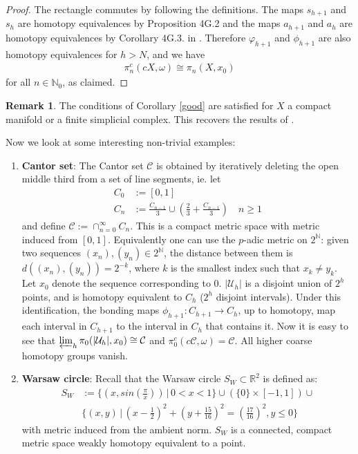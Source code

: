 \documentclass[a4paper,11pt]{article}
\theoremstyle{definition}
\newtheorem*{remark}{Remark}
\theoremstyle{plain}
\theoremstyle{remark}
\begin{document}
{\begin{proof}
The rectangle commutes by following the definitions. The maps $s_{h+1}$ and $s_{h}$ are homotopy equivalences by Proposition 4G.2 and the maps $a_{h+1}$ and $a_{h}$ are homotopy equivalences by Corollary 4G.3. in \cite{hatcher2002algebraic}. Therefore $\varphi_{h+1}$ and $\phi_{h+1}$ are also homotopy equivalences for $h>N$, and we have
\begin{align*}
\pi_{n}^{c}(cX,\omega)\cong \pi_{n}(X,x_0)
\end{align*}
for all $n\in \mathbb{N}_{0}$, as claimed. 
\end{proof}

\begin{remark} The conditions of Corollary \ref{good} are satisfied for $X$ a compact manifold or a finite simplicial complex. This recovers the results of \cite{mitchener2020coarse}. 
\end{remark}


Now we look at some interesting non-trivial examples:

\begin{enumerate}
\item \textbf{Cantor set}: The Cantor set $\mathcal{C}$ is obtained by iteratively deleting the open middle third from a set of line segments, ie. let
\begin{align*}
C_{0} &:= [0,1]\\
C_{n} &:= \frac{C_{n-1}}{3} \cup (\frac{2}{3} +\frac{C_{n-1}}{3}) \quad n\geq 1
\end{align*}
and define $\mathcal{C}:= \cap_{n=0}^{\infty} C_{n}$. This is a compact metric space with metric induced from $[0,1]$. Equivalently one can use the $p$-adic metric on $2^\mathbb{N}$: given two sequences $(x_n), (y_n)\in 2^\mathbb{N}$, the distance between them is $d((x_n),(y_n)) = 2^{-k}$, where $k$ is the smallest index such that $x_{k}\neq y_{k}$. \\

Let $x_0$ denote the sequence corresponding to $0$. $|\mathcal{U}_{h}|$ is a disjoint union of $2^{h}$ points, and is homotopy equivalent to $C_{h}$ ($2^h$ disjoint intervals). Under this identification, the bonding maps $\phi_{h+1}: C_{h+1} \rightarrow C_{h}$, up to homotopy, map each interval in $C_{h+1}$ to the interval in $C_{h}$ that contains it. Now it is easy to see that $\varprojlim_{h}\pi_{0}(|\mathcal{U}_{h}|,x_0) \cong \mathcal{C}$ and $\pi_{0}^{c}(c\mathcal{C},\omega) = \mathcal{C}$. All higher coarse homotopy groups vanish.
\item \textbf{Warsaw circle}: Recall that the Warsaw circle $S_{W}\subset \mathbb{R}^2$ is defined as:
\begin{align*}
S_{W} &:=  \{(x,sin(\frac{\pi}{x}))\,|\, 0<x<1\} \cup (\{0\} \times [-1,1]) \cup \\
& \{(x,y)\,|\, (x-\frac{1}{2})^2 +(y+\frac{15}{16})^2= (\frac{17}{16})^2, y\leq 0\}
\end{align*}
with metric induced from the ambient norm. $S_W$ is a connected, compact metric space weakly homotopy equivalent to a point. \\


\end{enumerate}}
\end{document}
